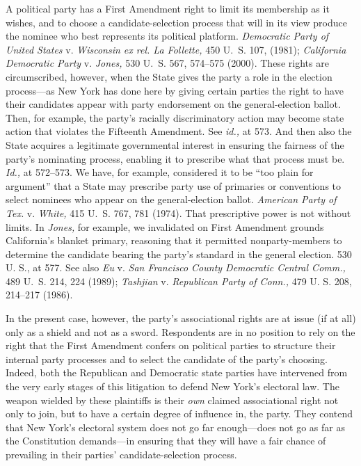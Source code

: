   A political party has a First Amendment right to limit its membership as it wishes, and to choose a candidate-selection process that will in its view produce the nominee who best represents its political platform. \emph{Democratic Party of United States} v. \emph{Wisconsin ex rel. La Follette,} 450 U.~S. 107,  (1981); \emph{California Democratic Party} v. \emph{Jones,} 530 U.~S. 567, 574--575 (2000). These rights are circumscribed, however, when the State gives the party a role in the election process---as New York has done here by giving certain parties the right to have their candidates appear with party endorsement on the general-election ballot. Then, for example, the party's racially discriminatory action may become state action that violates the Fifteenth Amendment. See \emph{id.,} at 573. And then also the State acquires a legitimate governmental interest in ensuring the fairness of the party's nominating process, enabling it to prescribe what that process must be. \emph{Id.,} at 572--573. We have, for example, considered it to be ``too plain for argument'' that a State may prescribe party use of primaries or conventions to select nominees who appear on the general-election ballot. \emph{American Party of Tex.} v. \emph{White,} 415 U.~S. 767, 781 (1974). That prescriptive power is not without limits. In \emph{Jones,} for example, we invalidated on First Amendment grounds California's blanket primary, reasoning that it permitted nonparty-members to determine the candidate bearing the party's standard in the general election. 530 U. S., at 577. See also \emph{Eu} v. \emph{San Francisco County Democratic Central Comm.,} 489 U.~S. 214, 224 (1989); \emph{Tashjian} v. \emph{Republican Party of Conn.,} 479 U. S. 208, 214--217 (1986).

  In the present case, however, the party's associational rights are at issue (if at all) only as a shield and not as a sword. Respondents are in no position to rely on the right that the First Amendment confers on political parties to structure their internal party processes and to select the candidate of the party's choosing. Indeed, both the Republican and Democratic state parties have intervened from the very early stages of this litigation to defend New York's electoral law. The weapon wielded by these plaintiffs is their \emph{own} claimed associational right not only to join, but to have a certain degree of influence in, the party. They contend that New York's electoral system does not go far enough---\newpage  does not go as far as the Constitution demands---in ensuring that they will have a fair chance of prevailing in their parties' candidate-selection process.

